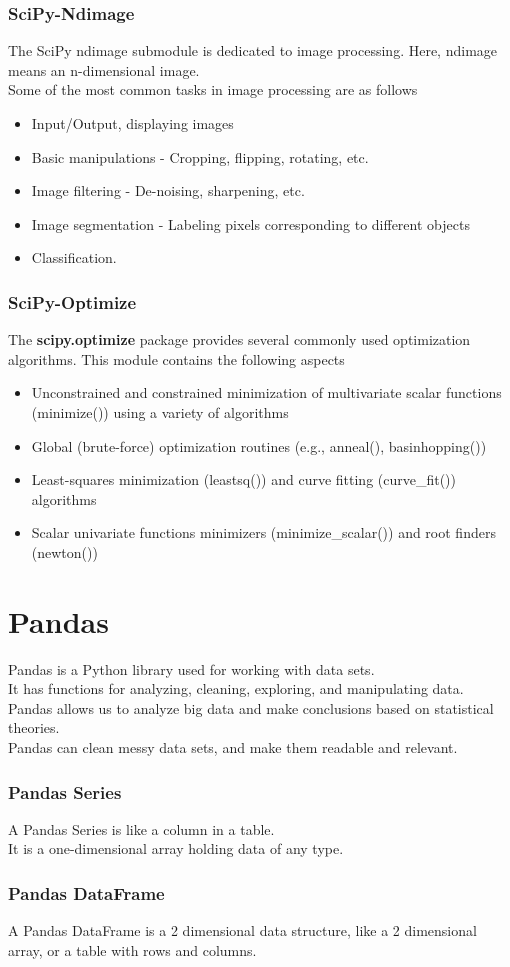 \subsubsection*{SciPy{-}Ndimage}
The SciPy ndimage submodule is dedicated to image processing. Here, ndimage means an n{-}dimensional image.\\
Some of the most common tasks in image processing are as follows
\begin{itemize}
    \item Input/Output, displaying images
    \item Basic manipulations {-} Cropping, flipping, rotating, etc.
    \item Image filtering {-} De{-}noising, sharpening, etc.
    \item Image segmentation {-} Labeling pixels corresponding to different objects
    \item Classification.
\end{itemize}

\subsubsection*{SciPy{-}Optimize}
The \textbf{scipy.optimize} package provides several commonly used optimization algorithms. This module contains the following aspects
\begin{itemize}
    \item Unconstrained and constrained minimization of multivariate scalar functions (minimize()) using a variety of algorithms
    \item Global (brute{-}force) optimization routines (e.g., anneal(), basinhopping())
    \item Least{-}squares minimization (leastsq()) and curve fitting (curve\_fit()) algorithms
    \item Scalar univariate functions minimizers (minimize\_scalar()) and root finders (newton())
\end{itemize}



\section*{Pandas}

Pandas is a Python library used for working with data sets.\\
It has functions for analyzing, cleaning, exploring, and manipulating data.\\
Pandas allows us to analyze big data and make conclusions based on statistical theories.\\
Pandas can clean messy data sets, and make them readable and relevant.
\subsubsection*{Pandas Series}
A Pandas Series is like a column in a table.\\
It is a one-dimensional array holding data of any type.
\subsubsection*{Pandas DataFrame}
A Pandas DataFrame is a 2 dimensional data structure, like a 2 dimensional array, or a table with rows and columns.